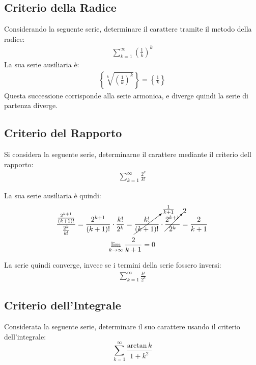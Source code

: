 \documentclass{article}
\numberwithin{equation}{subsection}
\begin{document}
\subsection{Criterio della Radice}

Considerando la seguente serie, determinare il carattere tramite il metodo della radice:
\begin{gather*}
    \displaystyle\sum_{k=1}^\infty\left(\frac{1}{k}\right)^k
\end{gather*}
La sua serie ausiliaria è:
\begin{gather*}
    \displaystyle\left\{\sqrt[k]{\left(\frac{1}{k}\right)^{k}}\right\}=\left\{\frac{1}{k}\right\}
\end{gather*}
Questa successione corrisponde alla serie armonica, e diverge quindi la serie di partenza diverge. 

\subsection{Criterio del Rapporto}

Si considera la seguente serie, determinarne il carattere mediante il criterio dell rapporto:
\begin{gather*}
    \displaystyle\sum_{k=1}^\infty\frac{2^k}{k!}
\end{gather*}

La sua serie ausiliaria è quindi:
\begin{gather*}
    \displaystyle\frac{\frac{2^{k+1}}{(k+1)!}}{\frac{2^k}{k!}}=
    \frac{2^{k+1}}{(k+1)!}\cdot\frac{k!}{2^k}=\cancelto{\frac{1}{k+1}}{\frac{k!}{(k+1)!}}\cdot\cancelto{2}{\frac{2^{k+1}}{2^k}}=\frac{2}{k+1}\\
    \lim_{k\to\infty}\frac{2}{k+1}=0
\end{gather*}

La serie quindi converge, invece se i termini della serie fossero inversi:
\begin{gather*}
    \displaystyle\sum_{k=1}^\infty\frac{k!}{2^k}
\end{gather*}

\subsection{Criterio dell'Integrale}

Considerata la seguente serie, determinare il suo carattere usando il criterio dell'integrale:
\begin{equation*}
    \displaystyle\sum_{k=1}^{\infty}\frac{\text{arctan}\, k}{1+k^2}
\end{equation*}
\end{document}
